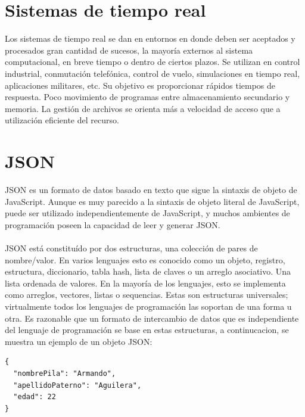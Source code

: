 \section{Sistemas de tiempo real}

Los sistemas de tiempo real se dan en entornos en donde deben ser aceptados y procesados gran cantidad de sucesos, la mayoría externos al sistema computacional, en breve tiempo o dentro de ciertos plazos.
Se utilizan en control industrial, conmutación telefónica, control de vuelo, simulaciones en tiempo real, aplicaciones militares, etc.
Su objetivo es proporcionar rápidos tiempos de respuesta.
Poco movimiento de programas entre almacenamiento secundario y memoria.
La gestión de archivos se orienta más a velocidad de acceso que a utilización eficiente del recurso.


\section{JSON}

JSON es un formato de datos basado en texto que sigue la sintaxis de objeto de JavaScript. Aunque es muy parecido a la sintaxis de objeto literal de JavaScript, puede ser utilizado independientemente de JavaScript, y muchos ambientes de programación poseen la capacidad de leer y generar JSON.

\paragraph{}JSON está constituído por dos estructuras, una colección de pares de nombre/valor. En varios lenguajes esto es conocido como un objeto, registro, estructura, diccionario, tabla hash, lista de claves o un arreglo asociativo.
Una lista ordenada de valores. En la mayoría de los lenguajes, esto se implementa como arreglos, vectores, listas o sequencias.
Estas son estructuras universales; virtualmente todos los lenguajes de programación las soportan de una forma u otra. Es razonable que un formato de intercambio de datos que es independiente del lenguaje de programación se base en estas estructuras, a continucacion, se muestra un ejemplo de un objeto JSON:


\begin{lstlisting}
{
  "nombrePila": "Armando",
  "apellidoPaterno": "Aguilera",
  "edad": 22
}
\end{lstlisting}


